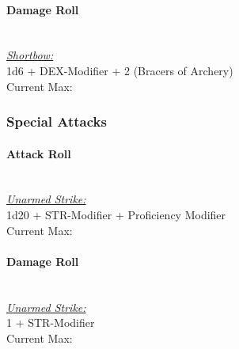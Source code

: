 {\paragraph*{Damage Roll}\hfill\\
\underline{\textit{Shortbow:}}\\
1d6 + DEX-Modifier + 2 (Bracers of Archery)\\
\indent Current Max: 
\subsubsection*{Special Attacks}
\paragraph*{Attack Roll}\hfill\\
\underline{\textit{Unarmed Strike:}}\\
1d20 + STR-Modifier + Proficiency Modifier\\
\indent Current Max: 
\paragraph*{Damage Roll}\hfill\\
\underline{\textit{Unarmed Strike:}}\\
1 + STR-Modifier\\
\indent Current Max: 
}